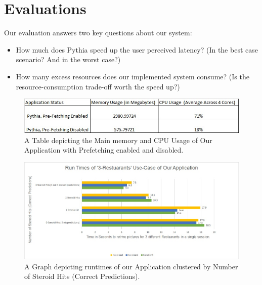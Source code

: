 \section{Evaluations}
\label{sec:eval}
Our evaluation answers two key questions about our system:
\begin{itemize}
\item How much does Pythia speed up the user perceived latency? (In the best case scenario? And in the worst case?)
\item How many excess resources does our implemented system consume? (Is the resource-consumption trade-off worth the speed up?)
\end{itemize}

\begin{figure}
  \includegraphics[width=\linewidth]{figs/applicationResourceUsageTable1.jpg}
  \caption{A Table depicting the Main memory and CPU Usage of Our Application with Prefetching enabled and disabled.}
  \label{fig:table1}
\end{figure}

\begin{figure}
  \includegraphics[width=\linewidth]{figs/runTimeChart1.jpg}
  \caption{A Graph depicting runtimes of our Application clustered by Number of Steroid Hits (Correct Predictions).}
  \label{fig:graph1}
\end{figure}

